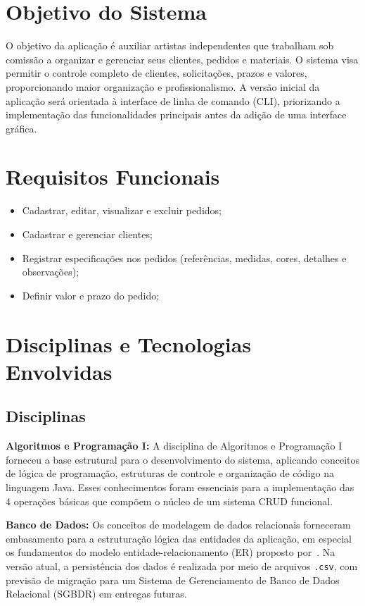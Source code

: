 \section{Objetivo do Sistema}
O objetivo da aplicação é auxiliar artistas independentes que trabalham sob 
comissão a organizar e gerenciar seus clientes, pedidos e materiais. O sistema 
visa permitir o controle completo de clientes, solicitações, prazos e valores, 
proporcionando maior organização e profissionalismo. A versão inicial da aplicação será orientada 
à interface de linha de comando (CLI), priorizando a implementação das 
funcionalidades principais antes da adição de uma interface gráfica.

\section{Requisitos Funcionais}
\begin{itemize}
    \item Cadastrar, editar, visualizar e excluir pedidos;
    \item Cadastrar e gerenciar clientes;
    \item Registrar especificações nos pedidos 
    (referências, medidas, cores, detalhes e observações);
    \item Definir valor e prazo do pedido;
\end{itemize}

\section{Disciplinas e Tecnologias Envolvidas}

\subsection{Disciplinas}

\textbf{Algoritmos e Programação I:}
A disciplina de Algoritmos e Programação I forneceu a base estrutural 
para o desenvolvimento do sistema, aplicando conceitos de lógica de 
programação, estruturas de controle e organização de código na linguagem 
Java. Esses conhecimentos foram essenciais para a implementação das 4 
operações básicas que compõem o núcleo de um sistema CRUD funcional.

\textbf{Banco de Dados:}
Os conceitos de modelagem de dados relacionais forneceram embasamento 
para a estruturação lógica das entidades da aplicação, em especial os 
fundamentos do modelo entidade-relacionamento (ER) proposto por~\cite{chen1976}. Na 
versão atual, a persistência dos dados é realizada por meio de arquivos 
\texttt{.csv}, com previsão de migração para um Sistema de Gerenciamento 
de Banco de Dados Relacional (SGBDR) em entregas futuras.

